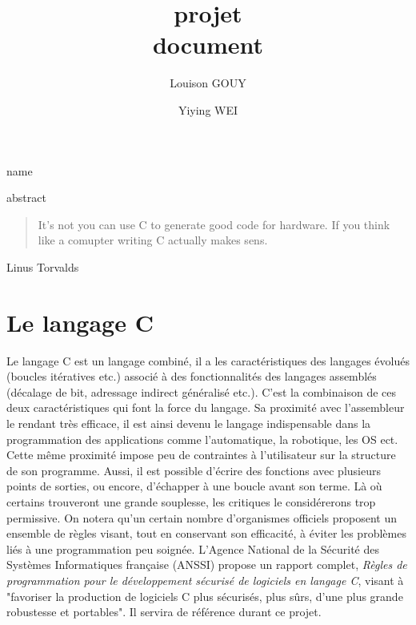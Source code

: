 \documentclass[a4paper]{article}
\title{\textbf{projet} \\ document}
\author{Louison GOUY \and Yiying WEI}
\begin{document}
\maketitle

\vspace{2cm}

\begin{center}
\end{center}

\vspace*{1cm}

\begin{center}
    name
\end{center}

\vspace*{7cm}

\begin{center}

abstract
\end{center}

\newpage
\vspace*{3cm}
\begin{quotation}
	It's not you can use C to generate good code for hardware. If you think like a comupter writing C actually makes sens.
\end{quotation}
\begin{flushright}
	Linus Torvalds
\end{flushright} 
\newpage


\newpage
\renewcommand{\contentsname}{Table des Matières}
\tableofcontents
\newpage
\renewcommand\listfigurename{Liste des figures}
\listoffigures
\newpage
\section{Le langage C}
Le langage C est un langage combiné, il a les caractéristiques des langages évolués (boucles itératives etc.) associé à des fonctionnalités des langages assemblés (décalage de bit, adressage indirect généralisé etc.). C'est la combinaison de ces deux caractéristiques qui font la force du langage\cite{Monteil2012}. Sa proximité avec l'assembleur le rendant très efficace, il est ainsi devenu le langage indispensable dans la programmation des applications comme l'automatique, la robotique, les OS ect. Cette même proximité impose peu de contraintes à l'utilisateur sur la structure de son programme. Aussi, il est possible d'écrire des fonctions avec plusieurs points de sorties, ou encore, d'échapper à une boucle avant son terme. Là où certains trouveront une grande souplesse, les critiques le considérerons trop permissive. On notera qu'un certain nombre d'organismes officiels proposent un ensemble de règles visant, tout en conservant son efficacité, à éviter les problèmes liés à une programmation peu soignée. L'Agence National de la Sécurité des Systèmes Informatiques française (ANSSI) propose un rapport complet, \textit{Règles de programmation pour le développement sécurisé de logiciels en langage C}\cite{ANSSI2021}, visant à "favoriser la production de logiciels C plus sécurisés, plus sûrs, d’une plus grande robustesse et portables". Il servira de référence durant ce projet.
\end{document}
